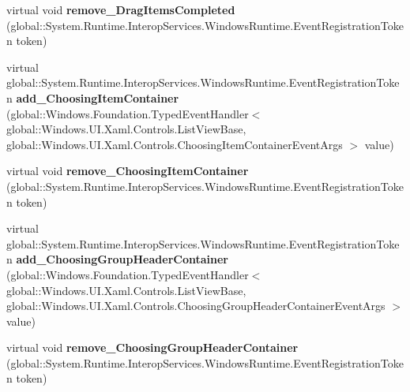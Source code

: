 \begin{DoxyCompactItemize}
\item 
\mbox{\label{class_windows_1_1_u_i_1_1_xaml_1_1_controls_1_1_list_view_base_afb4e5d552f4a20df8f6198bd74e0a5a0}} 
virtual void {\bfseries remove\+\_\+\+Drag\+Items\+Completed} (global\+::\+System.\+Runtime.\+Interop\+Services.\+Windows\+Runtime.\+Event\+Registration\+Token token)
\item 
\mbox{\label{class_windows_1_1_u_i_1_1_xaml_1_1_controls_1_1_list_view_base_a5f75e80fc48c067bdaeca77417953973}} 
virtual global\+::\+System.\+Runtime.\+Interop\+Services.\+Windows\+Runtime.\+Event\+Registration\+Token {\bfseries add\+\_\+\+Choosing\+Item\+Container} (global\+::\+Windows.\+Foundation.\+Typed\+Event\+Handler$<$ global\+::\+Windows.\+U\+I.\+Xaml.\+Controls.\+List\+View\+Base, global\+::\+Windows.\+U\+I.\+Xaml.\+Controls.\+Choosing\+Item\+Container\+Event\+Args $>$ value)
\item 
\mbox{\label{class_windows_1_1_u_i_1_1_xaml_1_1_controls_1_1_list_view_base_aa603855bd3d9391f02b8a6ae70908d43}} 
virtual void {\bfseries remove\+\_\+\+Choosing\+Item\+Container} (global\+::\+System.\+Runtime.\+Interop\+Services.\+Windows\+Runtime.\+Event\+Registration\+Token token)
\item 
\mbox{\label{class_windows_1_1_u_i_1_1_xaml_1_1_controls_1_1_list_view_base_ab0f949b356d976e285641bfd3da7aaa5}} 
virtual global\+::\+System.\+Runtime.\+Interop\+Services.\+Windows\+Runtime.\+Event\+Registration\+Token {\bfseries add\+\_\+\+Choosing\+Group\+Header\+Container} (global\+::\+Windows.\+Foundation.\+Typed\+Event\+Handler$<$ global\+::\+Windows.\+U\+I.\+Xaml.\+Controls.\+List\+View\+Base, global\+::\+Windows.\+U\+I.\+Xaml.\+Controls.\+Choosing\+Group\+Header\+Container\+Event\+Args $>$ value)
\item 
\mbox{\label{class_windows_1_1_u_i_1_1_xaml_1_1_controls_1_1_list_view_base_a514f2814e24dfe36251dae6870528441}} 
virtual void {\bfseries remove\+\_\+\+Choosing\+Group\+Header\+Container} (global\+::\+System.\+Runtime.\+Interop\+Services.\+Windows\+Runtime.\+Event\+Registration\+Token token)

\end{DoxyCompactItemize}
